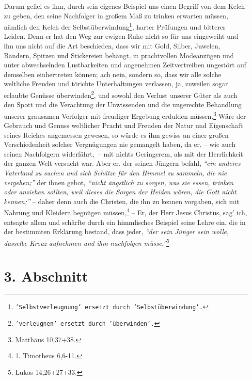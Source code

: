 Darum gefiel es ihm, durch sein eigenes Beispiel uns einen Begriff von dem
Kelch zu geben, den seine Nachfolger in großem Maß zu
trinken erwarten müssen,
nämlich den Kelch der Selbstüberwindung\footnote{\texttt{'Selbstverleugnung'
ersetzt durch 'Selbstüberwindung'.}},
harter Prüfungen und bitterer Leiden.
Denn er hat den Weg zur ewigen Ruhe nicht so für uns
eingeweiht und ihn uns
nicht auf die Art beschieden, dass wir mit Gold, Silber, Juwelen, Bändern,
Spitzen und Stickereien behängt, in prachtvollen Modeanzügen und unter
abwechselnden Lustbarkeiten und angenehmen Zeitvertreiben ungestört auf
demselben einhertreten können; ach nein, sondern so, dass wir alle solche
weltliche Freuden und törichte Unterhaltungen verlassen, ja, zuweilen sogar
erlaubte Genüsse überwinden\footnote{\texttt{'verleugnen' ersetzt durch
'überwinden'.}},
und sowohl den Verlust unserer Güter als auch den
Spott und die Verachtung der Unwissenden und die ungerechte Behandlung unserer
grausamen Verfolger mit freudiger Ergebung erdulden
müssen.\footnote{Matthäus 10,37+38.}
Wäre der Gebrauch und Genuss weltlicher Pracht und Freuden der Natur
und Eigenschaft seines Reiches angemessen gewesen, so würde es ihm gewiss an
einer großen Verschiedenheit solcher Vergnügungen nie gemangelt haben, da er, --
wie auch seinen Nachfolgern widerfährt,~-- mit nichts Geringerem, als mit der
Herrlichkeit der ganzen Welt versucht war. Aber er, der seinen Jüngern befahl,
\textit{"`ein anderes Vaterland zu suchen und sich Schätze für den Himmel zu
sammeln, die nie vergehen;"'} der ihnen gebot,
\textit{"`nicht ängstlich zu sorgen, was sie essen,
trinken oder anziehen sollten, weil dieses die Sorgen der Heiden wären,
die Gott nicht kennen;"'} -- daher denn auch die Christen, die ihn zu kennen
vorgaben, sich mit Nahrung und Kleidern begnügen müssen,\footnote{1. Timotheus
6,6-11.}
-- Er, der Herr Jesus Christus, sag’ ich, entsagte allem und schärfte
durch ein himmlisches Beispiel seine Lehre ein, die in der bestimmten Erklärung
bestand, dass jeder,
\textit{"`der sein Jünger sein wolle, dasselbe Kreuz aufnehmen und
ihm nachfolgen müsse."'}\footnote{Lukas 14,26+27+33.}

\section{3. Abschnitt} \label{kap16_ab3}


